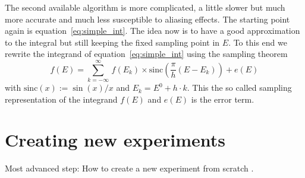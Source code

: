 The second available algorithm is more complicated, a little slower but
much more accurate and much less susceptible to aliasing effects. The starting
point again is equation~\ref{eq:simple_int}. The idea now is to
 have a good approximation to the integral but still keeping the fixed sampling
point in $E$. To this end we rewrite the integrand of 
equation~\ref{eq:simple_int} using the sampling theorem~\cite{NRC,Rybicki}
\begin{equation}
f(E)=\sum_{k=-\infty}^{\infty}\,f(E_k) 
\times \mathrm{sinc}\left(\frac{\pi}{h}(E-E_k)\right)+e(E)
\end{equation}
with $\mathrm{sinc}(x):=\sin(x)/x$ and $E_k=E^0+h\cdot k$. 
This the so called sampling 
representation of the integrand $f(E)$ and $e(E)$ is the error term.
 

  
\chapter{Creating new experiments}

Most advanced step: How to create a new experiment from scratch .

